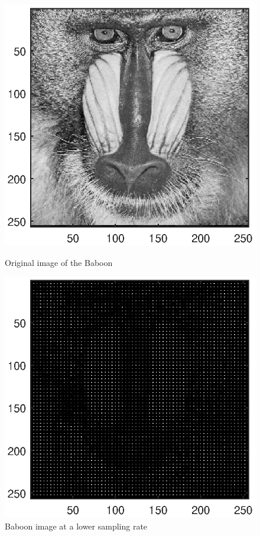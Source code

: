 \documentclass{article}
\begin{document}
\begin{figure}[H]
	\hspace{1cm}
	\begin{minipage}{0.5\linewidth}
		\includegraphics[scale=0.8]{fig2}
		\caption{Original image of the Baboon}
	\end{minipage}
	\begin{minipage}{0.5\linewidth}
		\includegraphics[scale=0.8]{fig3}
		\caption{Baboon image at a lower sampling rate}
	\end{minipage}
\end{figure}
\end{document}
